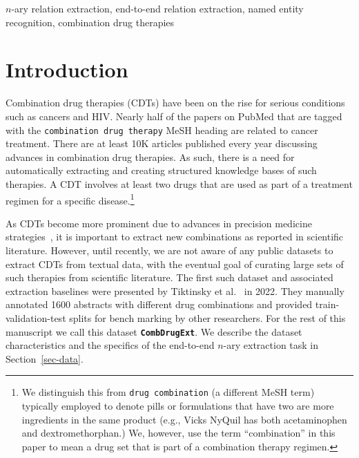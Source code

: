 \documentclass[conference]{IEEEtran}
\begin{document}
\begin{IEEEkeywords}
$n$-ary relation extraction, end-to-end relation extraction, named entity recognition, combination drug therapies
\end{IEEEkeywords}

\section{Introduction}
Combination drug therapies (CDTs) have been on the rise for serious conditions such as cancers and HIV. Nearly half of the papers on PubMed that are tagged with the \texttt{combination drug therapy} MeSH heading are related to cancer treatment. There are at least 10K articles published every year discussing advances in combination drug therapies. As such, there is a need for automatically extracting and creating structured knowledge bases of such therapies. A CDT involves at least two drugs that are used as part of a treatment regimen for a specific disease.\footnote{We distinguish this from  \texttt{drug combination} (a different MeSH term)  typically employed to denote pills or formulations that have two are more ingredients in the same product (e.g., Vicks NyQuil has both acetaminophen and dextromethorphan.) We, however, use the term ``combination'' in this paper to mean a drug set that is part of a combination therapy regimen.}

As CDTs become more prominent due to advances in precision medicine strategies~\cite{klauschen2014combinatorial}, it is important to extract new combinations as reported in scientific literature. However, until recently, we are not aware of any public datasets   to extract CDTs from textual data, with the eventual goal of curating large sets of such therapies from scientific literature. The first such dataset and associated extraction baselines were presented by Tiktinsky et al.~\cite{tiktinsky-etal-2022-dataset} in 2022. They manually annotated 1600 abstracts with different drug combinations and provided train-validation-test splits for bench marking by other researchers. For the rest of this manuscript we call this dataset \textbf{\texttt{CombDrugExt}}. 
We describe the dataset characteristics and the specifics of the end-to-end $n$-ary extraction task in Section~\ref{sec-data}. 
\end{document}
